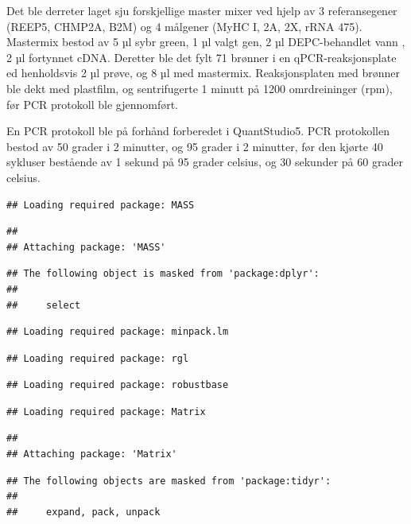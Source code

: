 \documentclass[
]{book}
\begin{document}
Det ble derreter laget sju forskjellige master mixer ved hjelp av 3 referansegener (REEP5, CHMP2A, B2M) og 4 målgener (MyHC I, 2A, 2X, rRNA 475). Mastermix bestod av 5 µl sybr green, 1 µl valgt gen, 2 µl DEPC-behandlet vann , 2 µl fortynnet cDNA. Deretter ble det fylt 71 brønner i en qPCR-reaksjonsplate ed henholdsvis 2 µl prøve, og 8 µl med mastermix. Reaksjonsplaten med brønner ble dekt med plastfilm, og sentrifugerte 1 minutt på 1200 omrdreininger (rpm), før PCR protokoll ble gjennomført.

En PCR protokoll ble på forhånd forberedet i QuantStudio5. PCR protokollen bestod av 50 grader i 2 minutter, og 95 grader i 2 minutter, før den kjørte 40 sykluser bestående av 1 sekund på 95 grader celsius, og 30 sekunder på 60 grader celsius.

\begin{verbatim}
## Loading required package: MASS
\end{verbatim}

\begin{verbatim}
## 
## Attaching package: 'MASS'
\end{verbatim}

\begin{verbatim}
## The following object is masked from 'package:dplyr':
## 
##     select
\end{verbatim}

\begin{verbatim}
## Loading required package: minpack.lm
\end{verbatim}

\begin{verbatim}
## Loading required package: rgl
\end{verbatim}

\begin{verbatim}
## Loading required package: robustbase
\end{verbatim}

\begin{verbatim}
## Loading required package: Matrix
\end{verbatim}

\begin{verbatim}
## 
## Attaching package: 'Matrix'
\end{verbatim}

\begin{verbatim}
## The following objects are masked from 'package:tidyr':
## 
##     expand, pack, unpack
\end{verbatim}
\end{document}
